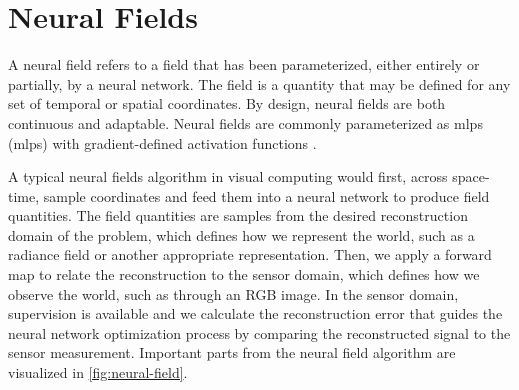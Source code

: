 \section{Neural Fields} %
A neural field refers to a field that has been parameterized, either entirely or partially, by a neural network. The field is a quantity that may be defined for any set of temporal or spatial coordinates. By design, neural fields are both continuous and adaptable. Neural fields are commonly parameterized as \acrlong{mlp}s (\acrshort{mlp}s) with gradient-defined activation functions \cite{xie_neural_2022}.

A typical neural fields algorithm in visual computing would first, across space-time, sample coordinates and feed them into a neural network to produce field quantities. The field quantities are samples from the desired reconstruction domain of the problem, which defines how we represent the world, such as a radiance field or another appropriate representation. Then, we apply a forward map to relate the reconstruction to the sensor domain, which defines how we observe the world, such as through an RGB image. In the sensor domain, supervision is available and we calculate the reconstruction error that guides the neural network optimization process by comparing the reconstructed signal to the sensor measurement. Important parts from the neural field algorithm are visualized in \autoref{fig:neural-field}.




